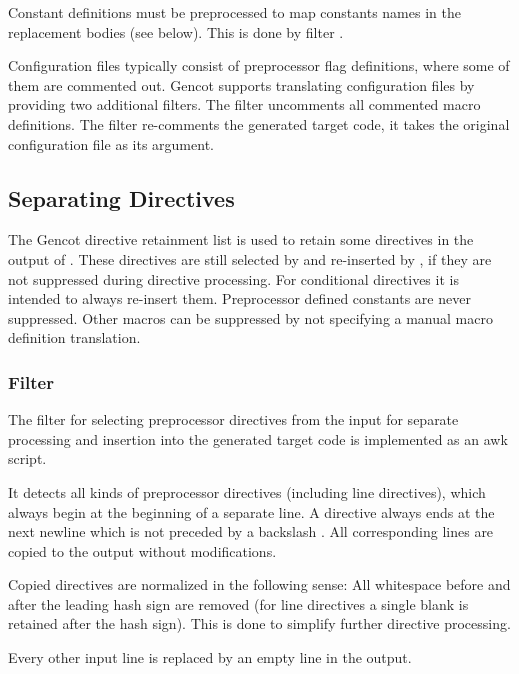 Constant definitions must be preprocessed to map constants names in the replacement bodies (see below). This
is done by filter .

Configuration files typically consist of preprocessor flag definitions, where some of them are commented out.
Gencot supports translating configuration files by providing two additional filters. The filter 
uncomments all commented macro definitions. The filter  re-comments the 
generated target code, it takes the original configuration file as its argument.

\subsection{Separating Directives}
\label{impl-preprocessor-separate}

The Gencot directive retainment list is used to retain some directives in the output of .
These directives are still selected by  and re-inserted by , if they
are not suppressed during directive processing. For conditional directives it is intended to always re-insert
them. Preprocessor defined constants are never suppressed. Other macros can be suppressed by not specifying
a manual macro definition translation.

\subsubsection{Filter }

The filter for selecting preprocessor directives from the input for separate processing and insertion into
the generated target code is implemented as an awk script.

It detects all kinds of preprocessor directives (including line directives), which always begin at the 
beginning of a separate line.
A directive always ends at the next newline which is not preceded by a backslash \code{\\}. All corresponding
lines are copied to the output without modifications.

Copied directives are normalized in the following sense: All whitespace before and after the leading hash
sign are removed (for line directives a single blank is retained after the hash sign). This is done to 
simplify further directive processing.

Every other input line is replaced by an empty line in the output.

